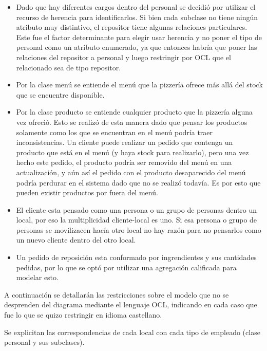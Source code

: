 \documentclass[a4paper,10pt]{article}
\begin{document}
\begin{itemize}
\item Dado que hay diferentes cargos dentro del personal se decidi\'o por utilizar el recurso de herencia para identificarlos. Si bien cada subclase
no tiene ning\'un atributo muy distintivo, el repositor tiene algunas relaciones particulares. Este fue el factor determinante para elegir usar herencia
y no poner el tipo de personal como un atributo enumerado, ya que entonces habr\'ia que poner las relaciones del repositor a personal y luego 
restringir por OCL que el relacionado sea de tipo repositor.
\item Por la clase men\'u se entiende el men\'u que la pizzer\'ia ofrece m\'as all\'a del stock que se encuentre disponible.
\item Por la clase producto se entiende cualquier producto que la pizzer\'ia alguna vez ofreci\'o. Esto se realiz\'o de esta manera dado que pensar 
los productos solamente como los que se encuentran en el men\'u podr\'ia traer inconsistencias. Un cliente puede realizar un pedido que contenga un producto
que est\'a en el men\'u (y haya stock para realizarlo), pero una vez hecho este pedido, el producto podr\'ia ser removido del men\'u en una actualizaci\'on,
y a\'un as\'i el pedido con el producto desaparecido del men\'u podr\'ia perdurar en el sistema dado que no se realiz\'o todav\'ia. Es por esto que
pueden existir productos por fuera del men\'u.
\item El cliente esta pensado como una persona o un grupo de personas dentro un local, por eso la multiplicidad cliente-local es uno. Si esa persona
o grupo de personas se movilizacen hac\'ia otro local no hay raz\'on para no pensarlos como un nuevo cliente dentro del otro local.
\item Un pedido de reposici\'on esta conformado por ingrendientes y sus cantidades pedidas, por lo que se opt\'o por utilizar una agregaci\'on calificada
para modelar esto.
\end{itemize}


\medskip

A continuaci\'on se detallar\'an las restricciones sobre el modelo que no se desprenden del diagrama mediante el lenguaje OCL, indicando en cada
caso que fue lo que se quizo restringir en idioma castellano.

\medskip

\noindent Se explicitan las correspondencias de cada local con cada tipo de empleado (clase personal y sus subclases).
\end{document}
